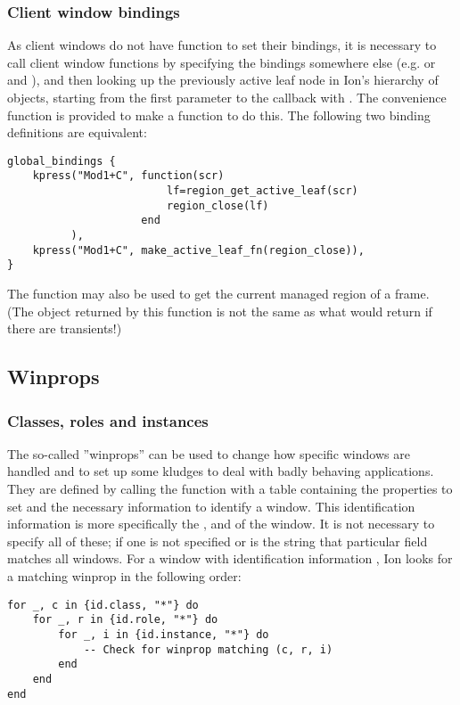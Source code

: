 \subsubsection{Client window bindings}

As client windows do not have function to set their bindings, it is
necessary to call client window functions by specifying the bindings
somewhere else (e.g.  or 
and ), and then looking up the previously
active leaf node in Ion's hierarchy of objects, starting from the
first parameter to the callback with
%
.
The convenience function  is provided to
make a function to do this. The following two binding definitions are
equivalent:

\begin{verbatim}
global_bindings {
    kpress("Mod1+C", function(scr)
                         lf=region_get_active_leaf(scr)
                         region_close(lf)
                     end
          ),
    kpress("Mod1+C", make_active_leaf_fn(region_close)),
}
\end{verbatim}

The function
may also be used to get the current managed region of a frame. (The
object returned by this function is not the same as what
 would return if there are transients!)


\subsection{Winprops}
\label{sec:winprops}

\subsubsection{Classes, roles and instances}

The so-called ''winprops'' can be used to change how
specific windows are handled and to set up some kludges to deal with
badly behaving applications. They are defined by calling the function
 with a table containing the properties to set and the
necessary information to identify a window. This identification
information is more specifically the
,
 and
of the window. It is not necessary to specify all of these; if one is
not specified or is the string  that particular field matches
all windows. For a window with identification information , Ion
looks for a matching winprop in the following order:
\begin{verbatim}
for _, c in {id.class, "*"} do
    for _, r in {id.role, "*"} do
        for _, i in {id.instance, "*"} do
            -- Check for winprop matching (c, r, i)
        end
    end
end
\end{verbatim}

